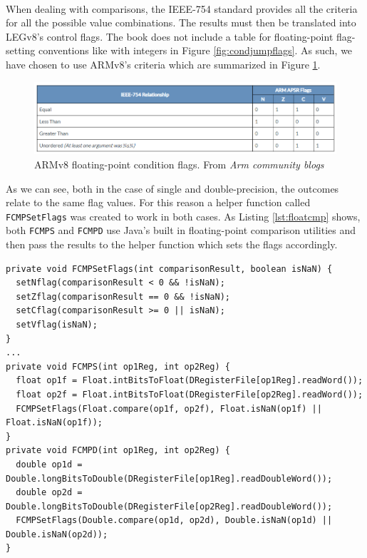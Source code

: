 \paragraph{}
When dealing with comparisons, the IEEE-754 standard \cite{ieee754} provides all the criteria for all the possible value combinations. The results must then be translated into LEGv8's control flags. The book \cite{patterson2016computer} does not include a table for floating-point flag-setting conventions like with integers in Figure \ref{fig:condjumpflags}. As such, we have chosen to use ARMv8's criteria \cite{web:armv8ieeejumpcodes} which are summarized in Figure \ref{fig:armv8condflags}.
\begin{figure}[H]
    \centering
    \includegraphics[width=1\linewidth]{img/ieee754_flags.png}
    \caption{ARMv8 floating-point condition flags. From \emph{Arm community blogs} \cite{web:armv8ieeejumpcodes}}
    \label{fig:armv8condflags}
\end{figure}
As we can see, both in the case of single and double-precision, the outcomes relate to the same flag values. For this reason a helper function called \verb|FCMPSetFlags| was created to work in both cases. As Listing \ref{lst:floatcmp} shows, both \verb|FCMPS| and \verb|FCMPD| use Java's built in floating-point comparison utilities and then pass the results to the helper function which sets the flags accordingly.
\begin{lstlisting}[float, caption={Floating-point comparisons implementations}, label={lst:floatcmp}]
private void FCMPSetFlags(int comparisonResult, boolean isNaN) {
  setNflag(comparisonResult < 0 && !isNaN);
  setZflag(comparisonResult == 0 && !isNaN);
  setCflag(comparisonResult >= 0 || isNaN);
  setVflag(isNaN);
}
...
private void FCMPS(int op1Reg, int op2Reg) {
  float op1f = Float.intBitsToFloat(DRegisterFile[op1Reg].readWord());
  float op2f = Float.intBitsToFloat(DRegisterFile[op2Reg].readWord());
  FCMPSetFlags(Float.compare(op1f, op2f), Float.isNaN(op1f) || Float.isNaN(op1f));	
}
private void FCMPD(int op1Reg, int op2Reg) {
  double op1d = Double.longBitsToDouble(DRegisterFile[op1Reg].readDoubleWord());
  double op2d = Double.longBitsToDouble(DRegisterFile[op2Reg].readDoubleWord());
  FCMPSetFlags(Double.compare(op1d, op2d), Double.isNaN(op1d) || Double.isNaN(op2d));
}
\end{lstlisting}
